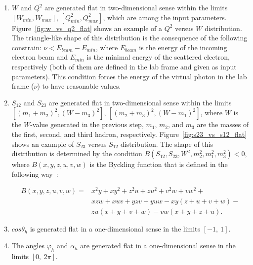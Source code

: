\begin{enumerate}
\item $W$ and $Q^2$ are generated flat in two-dimensional sense within the limits $[W_{min},W_{max}]$, $[Q^2_{min},Q^2_{max}]$, which are among the input parameters. Figure~\ref{fig:w_vs_q2_flat} shows an example of a $Q^2$ versus $W$ distribution. The triangle-like shape of this distribution is the consequence of the following constrain: $\nu < E_{beam} - E_{min}$, where $E_{beam}$ is the energy of the incoming electron beam and $E_{min}$ is the minimal energy of the scattered electron, respectively (both of them are defined in the lab frame and given as input parameters). This condition forces the energy of the virtual photon in the lab frame ($\nu$) to have reasonable values.

\item $S_{12}$ and $S_{23}$ are generated flat in two-dimensional sense within the limits $[(m_{1}+m_{2})^{2}, (W-m_{3})^2]$, $[(m_{2}+m_{3})^{2}, (W-m_{1})^2]$, where $W$ is the $W$-value generated in the previous step, $m_{1}$, $m_{2}$, and $m_{3}$ are the masses of the first, second, and third hadron, respectively. Figure~\ref{fig:s23_vs_s12_flat} shows an example of $S_{23}$ versus $S_{12}$ distribution. The shape of this distribution is determined by the condition $B(S_{12},S_{23},W^{2},m_{2}^{2},m_{1}^{2},m_{3}^{2}) <0$, where $B(x,y,z,u,v,w)$ is the Byckling function that is defined in the following way~\cite{Byckling:1971vca}:

\begin{equation}
\begin{split}
B(x,y,z,u,v,w) = &x^{2}y+xy^{2}+z^{2}u+zu^{2}+v^{2}w+vw^{2}+ \\   
&xzw+xuv+yzv+yuw- xy(z+u+v+w)- \\ 
&zu(x+y+v+w)-vw(x+y+z+u).
\label{eq:byckling}
\end{split}
\end{equation}

\item  $cos \theta_{h}$ is generated flat in a one-dimensional sense in the limits $[-1,~1]$. 
\item The angles $\varphi_{h}$ and $\alpha_{h}$ are generated flat in a one-dimensional sense in the limits $[0,~2\pi]$.
\end{enumerate}




